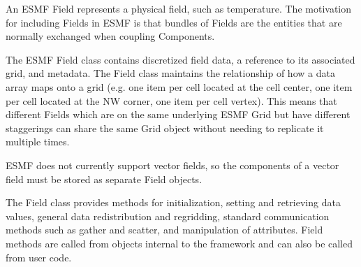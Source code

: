 
An ESMF Field represents a physical field, such as temperature.
The motivation for including Fields in ESMF is that bundles of 
Fields are the entities that are normally exchanged when coupling
Components.
  
The ESMF Field class contains discretized field data, a reference 
to its associated grid, and metadata.  The Field class maintains the
relationship of how a data array maps onto a grid (e.g. one item per
cell located at the cell center, one item per cell located at the NW
corner,  one item per cell vertex).  This means that different Fields
which are on the same underlying ESMF Grid but have different
staggerings can share the same Grid object without needing to replicate
it multiple times. 

ESMF does not currently support vector fields, so the components of 
a vector field must be stored as separate Field objects.  

The Field class provides methods for initialization, setting and 
retrieving data values, general data redistribution and regridding, 
standard communication methods such as gather and scatter, and 
manipulation of attributes.  Field methods are called from objects
internal to the framework and can also be called from user code.



